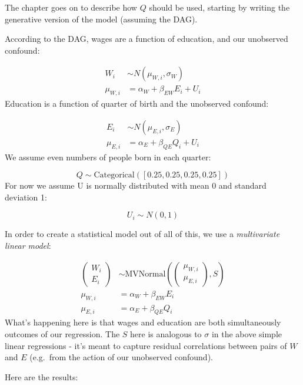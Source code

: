 \documentclass[
]{book}
\begin{document}
The chapter goes on to describe how \(Q\) should be used, starting by writing the generative version of the model (assuming the DAG).

According to the DAG, wages are a function of education, and our unobserved confound:

\[
\begin{aligned}
W_i &\sim N(\mu_{W,i},\sigma_W)\\
\mu_{W,i} &= \alpha_W + \beta_{EW}E_i + U_i
\end{aligned}
\]
Education is a function of quarter of birth and the unobserved confound:

\[
\begin{aligned}
E_i &\sim N(\mu_{E,i},\sigma_E)\\
\mu_{E,i} &= \alpha_E + \beta_{QE}Q_i + U_i
\end{aligned}
\]
We assume even numbers of people born in each quarter:

\[
Q \sim \text{Categorical}([0.25,0.25,0.25,0.25])
\]
For now we assume U is normally distributed with mean 0 and standard deviation 1:

\[
U_i \sim N(0,1)
\]

In order to create a statistical model out of all of this, we use a \emph{multivariate linear model}:

\[
\begin{aligned}
\begin{pmatrix} W_i \\ E_i \end{pmatrix} &\sim \text{MVNormal}(\begin{pmatrix} \mu_{W,i} \\ \mu_{E,i} \end{pmatrix},S)\\
\mu_{W,i} &= \alpha_W + \beta_{EW}E_i \\
\mu_{E,i} &= \alpha_E + \beta_{QE}Q_i
\end{aligned}
\]
What's happening here is that wages and education are both simultaneously outcomes of our regression. The \(S\) here is analogous to \(\sigma\) in the above simple linear regressions - it's meant to capture residual correlations between pairs of \(W\) and \(E\) (e.g.~from the action of our unobserved confound).

Here are the results:
\end{document}
